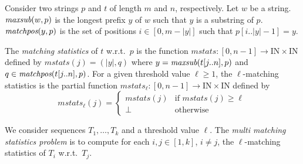 \documentclass[12pt]{article}
\newcommand{\Maxsub}[2]{\emph{maxsub}(#1,#2)}
\newcommand{\Substring}[3]{#1[#2..#3]}
\newcommand{\Matchpos}[2]{\emph{matchpos}(#1,#2)}
\newcommand{\Nats}{\textrm{I}\!\textrm{N}}
\newcommand{\Size}[1]{|#1|}
\begin{document}
Consider two strings \(p\) and \(t\) of length \(m\) and \(n\), respectively.
Let \(w\) be a string. 
\(\Maxsub{w}{p}\) is the longest prefix \(y\) of \(w\) such that 
\(y\) is a substring of \(p\). 
\(\Matchpos{y}{p}\) is the set of positions \(i\in[0,m-\Size{y}]\) such that
\(\Substring{p}{i}{\Size{y}-1}=y\).

The \emph{matching statistics} of \(t\) w.r.t.\ \(p\) is the function
\(mstats:[0,n-1]\to \Nats\times\Nats\)
defined by \(mstats(j)=(\Size{y},q)\) where 
\(y=\Maxsub{\Substring{t}{j}{n}}{p}\) and 
\(q\in\Matchpos{\Substring{t}{j}{n}}{p}\).
For a given threshold value \(\ell\geq 1\), the \(\ell\)-matching statistics
is the partial function
\(mstats_{\ell}:[0,n-1]\to \Nats\times\Nats\) defined by
\[
mstats_{\ell}(j)=\left\{
\begin{array}{ll}
mstats(j)&\mbox{if }mstats(j)\geq\ell\\
\bot&\mbox{otherwise}
\end{array}\right.
\]

We consider sequences \(T_{1},\ldots,T_{k}\) and a threshold value 
\(\ell\). The \emph{multi matching statistics problem} is to compute 
for each \(i,j\in[1,k]\), \(i\neq j\), the \(\ell\)-matching statistics
of \(T_{i}\) w.r.t.\ \(T_{j}\).
\end{document}
